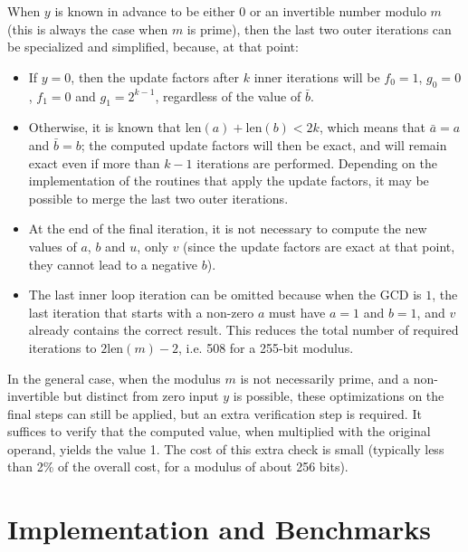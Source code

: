 \documentclass{llncs}
\newcommand{\bitlength}{\text{len}}
\begin{document}
When $y$ is known in advance to be either 0 or an invertible number
modulo $m$ (this is always the case when $m$ is prime), then the last
two outer iterations can be specialized and simplified, because, at
that point:
\begin{itemize}

    \item If $y = 0$, then the update factors after $k$ inner
    iterations will be $f_0 = 1$, $g_0 = 0$, $f_1 = 0$ and $g_1 = 2^{k-1}$,
    regardless of the value of $\bar b$.

    \item Otherwise, it is known that $\bitlength(a) + \bitlength(b) <
    2k$, which means that $\bar a = a$ and $\bar b = b$; the computed
    update factors will then be exact, and will remain exact even if
    more than $k-1$ iterations are performed. Depending on the
    implementation of the routines that apply the update factors, it may
    be possible to merge the last two outer iterations.

    \item At the end of the final iteration, it is not necessary to
    compute the new values of $a$, $b$ and $u$, only $v$ (since the
    update factors are exact at that point, they cannot lead to a
    negative $b$).

    \item The last inner loop iteration can be omitted because when the
    GCD is $1$, the last iteration that starts with a non-zero $a$ must
    have $a = 1$ and $b = 1$, and $v$ already contains the correct
    result. This reduces the total number of required iterations to
    $2\bitlength(m) - 2$, i.e. 508 for a 255-bit modulus.

\end{itemize}

In the general case, when the modulus $m$ is not necessarily prime, and
a non-invertible but distinct from zero input $y$ is possible, these
optimizations on the final steps can still be applied, but an extra
verification step is required. It suffices to verify that the computed
value, when multiplied with the original operand, yields the value 1.
The cost of this extra check is small (typically less than 2\% of the
overall cost, for a modulus of about 256 bits).

\section{Implementation and Benchmarks}
\end{document}
